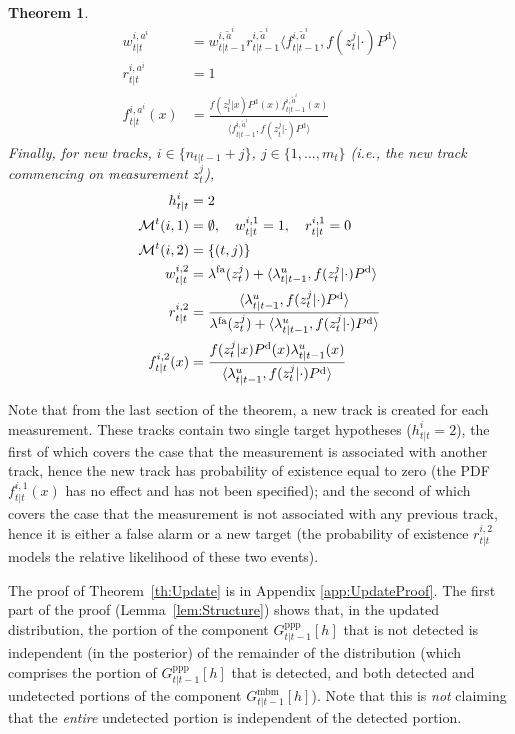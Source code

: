 \documentclass[journal,twoside]{IEEEtran}
\theoremstyle{plain}
\newtheorem{theorem}{Theorem}
\begin{document}
\begin{theorem}
\begin{align}
w_{t|t}^{i,a^i} &= w^{i,\tilde{a}^i}_{t|t-1}r_{t|t-1}^{i,\tilde{a}^i}\langle f_{t|t-1}^{i,\tilde{a}^i},f(z_t^j|\cdot)P^{\mathrm{d}}\rangle \label{eq:DetUpdateW}\\
r^{i,a^i}_{t|t} &= 1 \label{eq:DetUpdatePex}\\
f^{i,a^i}_{t|t}(x) &= \frac{f(z_t^j|x)P^{\mathrm{d}}(x)f_{t|t-1}^{i,\tilde{a}^i}(x)}{\langle f_{t|t-1}^{i,\tilde{a}^i},f(z_t^j|\cdot)P^{\mathrm{d}}\rangle} \label{eq:DetUpdateKin}
\end{align}
%
Finally, for new tracks, $i\in\{n_{t|t-1}+j\}$, $j\in\{1,\dots,m_t\}$ (\textit{i.e.}\xspace, the new track commencing on measurement $z_t^j$),
%
\begin{align}
h^i_{t|t} &= 2 \\
{\cal M}^t(i,1) &= \emptyset, \quad
w^{i,1}_{t|t} = 1, \quad r^{i,1}_{t|t} = 0 \label{eq:NewTargetNonExistWQ} \\
{\cal M}^t(i,2) &= \{(t,j)\} \label{eq:PoisUpdateMeasSet} \\
w^{i,2}_{t|t} &=  \lambda^\mathrm{fa}(z_t^j) + \langle\lambda^u_{t|t-1},f(z_t^j|\cdot)P^{\mathrm{d}}\rangle \label{eq:PoisUpdateW} \\
r_{t|t}^{i,2} &= \frac{\langle\lambda^u_{t|t-1},f(z_t^j|\cdot)P^{\mathrm{d}}\rangle}{\lambda^\mathrm{fa}(z_t^j) + \langle\lambda^u_{t|t-1},f(z_t^j|\cdot)P^{\mathrm{d}}\rangle} \label{eq:PoisUpdatePex}\\
f_{t|t}^{i,2}(x) &= \frac{f(z_t^j|x)P^{\mathrm{d}}(x)\lambda^u_{t|t-1}(x)}{\langle\lambda^u_{t|t-1},f(z_t^j|\cdot)P^{\mathrm{d}}\rangle} \label{eq:PoisUpdateKin} 
\end{align}
\end{theorem}
%
Note that from the last section of the theorem, a new track is created for each measurement. These tracks contain two single target hypotheses ($h^i_{t|t}=2$), the first of which covers the case that the measurement is associated with another track, hence the new track has probability of existence equal to zero (the PDF $f_{t|t}^{i,1}(x)$ has no effect and has not been specified); and the second of which covers the case that the measurement is not associated with any previous track, hence it is either a false alarm or a new target (the probability of existence $r_{t|t}^{i,2}$ models the relative likelihood of these two events). 

The proof of Theorem~\ref{th:Update} is in Appendix \ref{app:UpdateProof}\xspace. The first part of the proof (Lemma~\ref{lem:Structure}) shows that, in the updated distribution, the portion of the component $G^\mathrm{ppp}_{t|t-1}[h]$ that is not detected is independent (in the posterior) of the remainder of the distribution (which comprises the portion of $G^\mathrm{ppp}_{t|t-1}[h]$ that is detected, and both detected and undetected portions of the component $G^\mathrm{mbm}_{t|t-1}[h]$). Note that this is \emph{not} claiming that the \emph{entire} undetected portion is independent of the detected portion.
\end{document}
